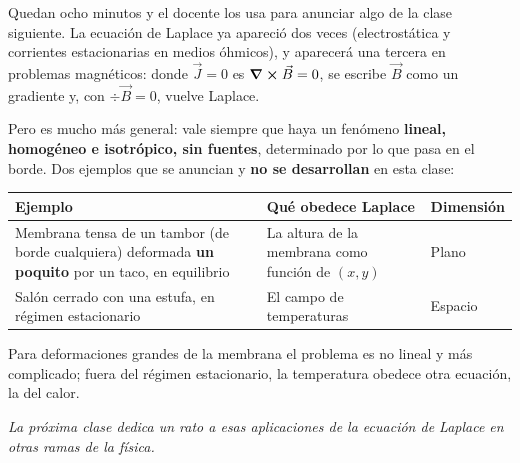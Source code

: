 \documentclass[12pt,a4paper]{article}
\begin{document}
Quedan ocho minutos y el docente los usa para anunciar algo de la clase
siguiente. La ecuación de Laplace ya apareció dos veces (electrostática y
corrientes estacionarias en medios óhmicos), y aparecerá una tercera en
problemas magnéticos: donde $\vec J = 0$ es $\curl \vec B = 0$, se escribe
$\vec B$ como un gradiente y, con $\div \vec B = 0$, vuelve Laplace.

Pero es mucho más general: vale siempre que haya un fenómeno \textbf{lineal,
homogéneo e isotrópico, sin fuentes}, determinado por lo que pasa en el borde.
Dos ejemplos que se anuncian y \textbf{no se desarrollan} en esta clase:

\begin{center}
\renewcommand{\arraystretch}{1.35}
\small
\begin{tabularx}{\textwidth}{>{\raggedright\arraybackslash}X>{\raggedright\arraybackslash}X>{\raggedright\arraybackslash}X}
\toprule
\textbf{Ejemplo} & \textbf{Qué obedece Laplace} & \textbf{Dimensión} \\
\midrule
Membrana tensa de un tambor (de borde cualquiera) deformada \textbf{un poquito} por un taco, en equilibrio & La altura de la membrana como función de $(x,y)$ & Plano \\
Salón cerrado con una estufa, en régimen estacionario & El campo de temperaturas & Espacio \\
\bottomrule
\end{tabularx}
\end{center}

Para deformaciones grandes de la membrana el problema es no lineal y más
complicado; fuera del régimen estacionario, la temperatura obedece otra
ecuación, la del calor.

\noindent\emph{La próxima clase dedica un rato a esas aplicaciones de la ecuación de Laplace
en otras ramas de la física.}
\end{document}
